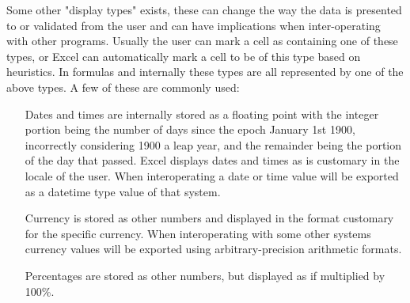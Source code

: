Some other "display types" exists, these can change the way the data is presented to or validated from the user and can have implications when inter-operating with other programs.
Usually the user can mark a cell as containing one of these types, or Excel can automatically mark a cell to be of this type based on heuristics.
In formulas and internally these types are all represented by one of the above types.
A few of these are commonly used:
\begin{itemize}
\item[Dates and times] are internally stored as a floating point with the integer portion being the number of days since the epoch January 1st 1900, incorrectly considering 1900 a leap year, and the remainder being the portion of the day that passed.
Excel displays dates and times as is customary in the locale of the user.
When interoperating a date or time value will be exported as a datetime type value of that system.
\item[Currency] is stored as other numbers and displayed in the format customary for the specific currency. When interoperating with some other systems currency values will be exported using arbitrary-precision arithmetic formats.
\item[Percentages] are stored as other numbers, but displayed as if multiplied by 100\%.
\end{itemize}